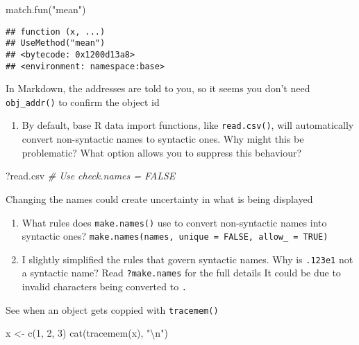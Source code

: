 \documentclass[
]{article}
\newenvironment{Shaded}{\begin{snugshade}}{\end{snugshade}}
\newcommand{\CommentTok}[1]{\textcolor[rgb]{0.56,0.35,0.01}{\textit{#1}}}
\newcommand{\DecValTok}[1]{\textcolor[rgb]{0.00,0.00,0.81}{#1}}
\newcommand{\FunctionTok}[1]{\textcolor[rgb]{0.00,0.00,0.00}{#1}}
\newcommand{\NormalTok}[1]{#1}
\newcommand{\OtherTok}[1]{\textcolor[rgb]{0.56,0.35,0.01}{#1}}
\newcommand{\SpecialCharTok}[1]{\textcolor[rgb]{0.00,0.00,0.00}{#1}}
\newcommand{\StringTok}[1]{\textcolor[rgb]{0.31,0.60,0.02}{#1}}
\providecommand{\tightlist}{%
  \setlength{\itemsep}{0pt}\setlength{\parskip}{0pt}}
\begin{document}
\begin{Shaded}
\begin{Highlighting}[]
\FunctionTok{match.fun}\NormalTok{(}\StringTok{"mean"}\NormalTok{)}
\end{Highlighting}
\end{Shaded}

\begin{verbatim}
## function (x, ...) 
## UseMethod("mean")
## <bytecode: 0x1200d13a8>
## <environment: namespace:base>
\end{verbatim}

In Markdown, the addresses are told to you, so it seems you don't need
\texttt{obj\_addr()} to confirm the object id

\begin{enumerate}
\def\labelenumi{\arabic{enumi}.}
\setcounter{enumi}{2}
\tightlist
\item
  By default, base R data import functions, like \texttt{read.csv()},
  will automatically convert non-syntactic names to syntactic ones. Why
  might this be problematic? What option allows you to suppress this
  behaviour?
\end{enumerate}

\begin{Shaded}
\begin{Highlighting}[]
\NormalTok{?read.csv}
\CommentTok{\# Use \textasciigrave{}check.names = FALSE\textasciigrave{}}
\end{Highlighting}
\end{Shaded}

Changing the names could create uncertainty in what is being displayed

\begin{enumerate}
\def\labelenumi{\arabic{enumi}.}
\setcounter{enumi}{3}
\item
  What rules does \texttt{make.names()} use to convert non-syntactic
  names into syntactic ones?
  \texttt{make.names(names,\ unique\ =\ FALSE,\ allow\_\ =\ TRUE)}
\item
  I slightly simplified the rules that govern syntactic names. Why is
  \texttt{.123e1} not a syntactic name? Read \texttt{?make.names} for
  the full details It could be due to invalid characters being converted
  to \texttt{.}
\end{enumerate}

See when an object gets coppied with \texttt{tracemem()}

\begin{Shaded}
\begin{Highlighting}[]
\NormalTok{x }\OtherTok{\textless{}{-}} \FunctionTok{c}\NormalTok{(}\DecValTok{1}\NormalTok{, }\DecValTok{2}\NormalTok{, }\DecValTok{3}\NormalTok{)}
\FunctionTok{cat}\NormalTok{(}\FunctionTok{tracemem}\NormalTok{(x), }\StringTok{"}\SpecialCharTok{\textbackslash{}n}\StringTok{"}\NormalTok{)}
\end{Highlighting}
\end{Shaded}
\end{document}
